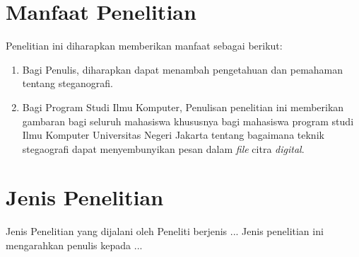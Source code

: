 \section{Manfaat Penelitian}
Penelitian ini diharapkan memberikan manfaat sebagai berikut:
	\begin{enumerate}
		\item Bagi Penulis, diharapkan dapat menambah pengetahuan dan pemahaman tentang steganografi.
		\item Bagi Program Studi Ilmu Komputer, Penulisan penelitian ini memberikan gambaran bagi seluruh mahasiswa khususnya bagi mahasiswa program studi Ilmu Komputer Universitas Negeri Jakarta tentang bagaimana teknik stegaografi dapat menyembunyikan pesan dalam \emph{file} citra \emph{digital}.  	
	\end{enumerate}

\section{Jenis Penelitian}
Jenis Penelitian yang dijalani oleh Peneliti berjenis ... Jenis penelitian ini mengarahkan penulis kepada ...		
\begin{comment}

\end{comment}
